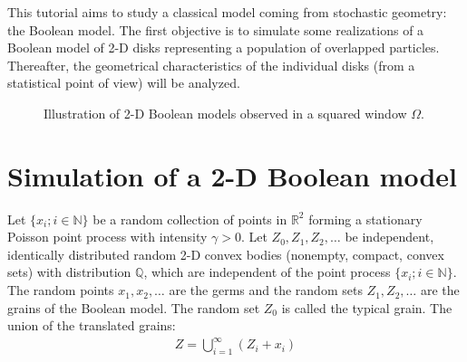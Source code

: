 \def\difficulty{3}


\vspace*{-15pt}

\begin{note}This tutorial aims to study a classical model coming from stochastic geometry: the Boolean model. The first objective is to simulate some realizations of a Boolean model of 2-D disks representing a population of overlapped particles. Thereafter, the geometrical characteristics of the individual disks (from a statistical point of view) will be analyzed.  
\end{note}

\vspace*{-10pt}

\begin{figure}[H]
\centering%
\caption{Illustration of 2-D Boolean models observed in a squared window $\Omega$.}%
\hspace*{1.5cm}
%
\vspace*{-10pt}%
\label{fig:booleanModel}%
\end{figure}

\vspace*{-18pt}

\section{Simulation of a 2-D Boo\-lean model}
\vspace*{-10pt}
Let $\{x_i;i\in \mathbb{N}\}$ be a random collection of points in $\mathbb{R}^2$ forming a stationary Poisson point process with intensity $\gamma>0$. 
Let $Z_0,Z_1,Z_2,\dots$ be independent, identically distributed random 2-D convex bodies (nonempty, compact, convex sets) with distribution $\mathbb{Q}$, which are independent of the point process $\{x_i;i\in \mathbb{N}\}$. The random points $x_1,x_2,\dots$ are the germs and the random sets $Z_1,Z_2,\dots$ are the grains of the Boolean
model. The random set $Z_0$ is called the typical grain. The union of the translated grains:\vspace*{-8pt}
\begin{eqnarray}
Z=\bigcup_{i=1}^{\infty}(Z_i+x_i)
\end{eqnarray}
\vspace*{-12pt}

